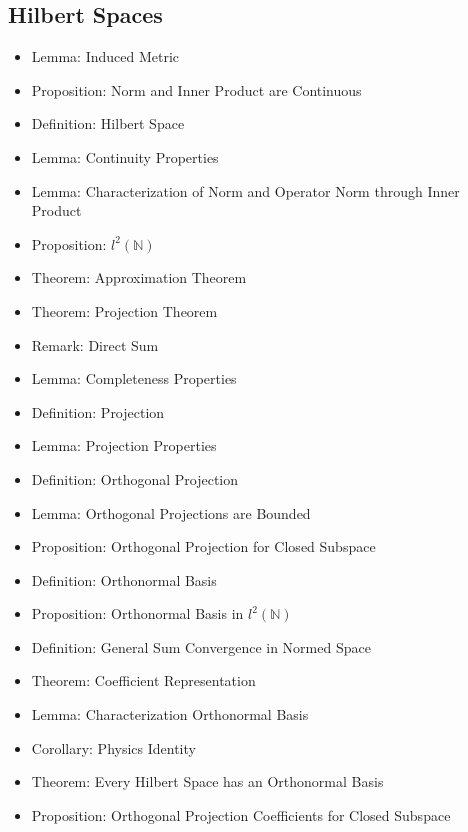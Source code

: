 \documentclass[8pt,twocolumn]{article}
\begin{document}
    \subsection{Hilbert Spaces} %
    \label{sub:hilbert_spaces}
      \begin{itemize}
        \item Lemma: Induced Metric
        \item Proposition: Norm and Inner Product are Continuous
        \item Definition: Hilbert Space
        \item Lemma: Continuity Properties
        \item Lemma: Characterization of Norm and Operator Norm through Inner Product
        \item Proposition: $l^2(\mathds{N})$
        \item Theorem: Approximation Theorem
        \item Theorem: Projection Theorem
        \item Remark: Direct Sum
        \item Lemma: Completeness Properties
        \item Definition: Projection
        \item Lemma: Projection Properties
        \item Definition: Orthogonal Projection
        \item Lemma: Orthogonal Projections are Bounded
        \item Proposition: Orthogonal Projection for Closed Subspace
        \item Definition: Orthonormal Basis
        \item Proposition: Orthonormal Basis in $l^2(\mathds{N})$
        \item Definition: General Sum Convergence in Normed Space
        \item Theorem: Coefficient Representation
        \item Lemma: Characterization Orthonormal Basis
        \item Corollary: Physics Identity
        \item Theorem: Every Hilbert Space has an Orthonormal Basis
        \item Proposition: Orthogonal Projection Coefficients for Closed Subspace
      \end{itemize}
\end{document}
